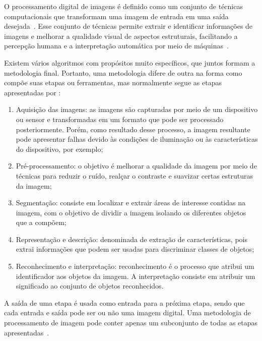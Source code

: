 O processamento digital de imagens é definido como um conjunto de técnicas computacionais que transformam uma imagem de entrada em uma saída desejada~\cite{gonzalez2008digital}. Esse conjunto de técnicas permite extrair e identificar informações de imagens e melhorar a qualidade visual de aspectos estruturais, facilitando a percepção humana e a interpretação automática por meio de máquinas~\cite{pedrini2008analise}.

Existem vários algoritmos com propósitos muito específicos, que juntos formam a metodologia final. Portanto, uma metodologia difere de outra na forma como compõe suas etapas ou ferramentas, mas normalmente segue as etapas apresentadas por :

\begin{enumerate}
    \item Aquisição das imagens: as imagens são capturadas por meio de um dispositivo ou sensor e transformadas em um formato que pode ser processado posteriormente. Porém, como resultado desse processo, a imagem resultante pode apresentar falhas devido às condições de iluminação ou às características do dispositivo, por exemplo;
    
    \item Pré-processamento: o objetivo é melhorar a qualidade da imagem por meio de técnicas para reduzir o ruído, realçar o contraste e suavizar certas estruturas da imagem;
    
    \item Segmentação: consiste em localizar e extrair áreas de interesse contidas na imagem, com o objetivo de dividir a imagem isolando os diferentes objetos que a compõem;
    
    \item Representação e descrição: denominada de extração de características, pois extrai informações que podem ser usadas para discriminar classes de objetos;
    
    \item Reconhecimento e interpretação: reconhecimento é o processo que atribui um identificador aos objetos da imagem. A interpretação consiste em atribuir um significado ao conjunto de objetos reconhecidos.
\end{enumerate}

A saída de uma etapa é usada como entrada para a próxima etapa, sendo que cada entrada e saída pode ser ou não uma imagem digital. Uma metodologia de processamento de imagem pode conter apenas um subconjunto de todas as etapas apresentadas~\cite{BRAZ:2014}.

